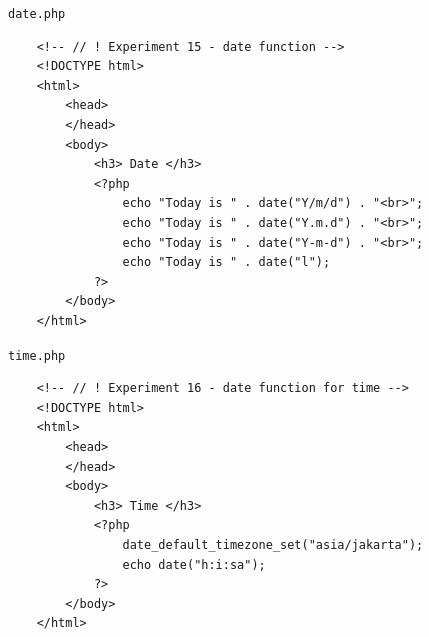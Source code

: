 \documentclass[12pt,titlepage]{article}
\begin{document}
\texttt{date.php}
\begin{verbatim}
    <!-- // ! Experiment 15 - date function -->
    <!DOCTYPE html>
    <html>
        <head>
        </head>
        <body>
            <h3> Date </h3>
            <?php
                echo "Today is " . date("Y/m/d") . "<br>";
                echo "Today is " . date("Y.m.d") . "<br>";
                echo "Today is " . date("Y-m-d") . "<br>";
                echo "Today is " . date("l");
            ?>
        </body>
    </html>
\end{verbatim}

\texttt{time.php}
\begin{verbatim}
    <!-- // ! Experiment 16 - date function for time -->
    <!DOCTYPE html>
    <html>
        <head>
        </head>
        <body>
            <h3> Time </h3>
            <?php
                date_default_timezone_set("asia/jakarta");
                echo date("h:i:sa");
            ?>
        </body>
    </html>
\end{verbatim}
\end{document}
